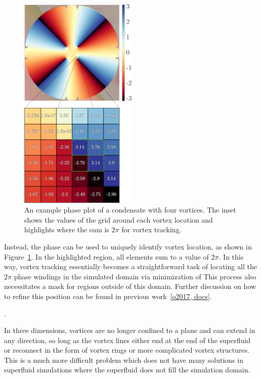 \begin{figure}
\center \includegraphics[width = 0.5\textwidth]{data/gpu/vortex_tracking/phi_grid.png}
\caption{An example phase plot of a condensate with four vortices.
The inset shows the values of the grid around each vortex location and highlights where the sum is $2\pi$ for vortex tracking.
}
\label{fig:phase}
\end{figure}

Instead, the phase can be used to uniquely identify vortex location, as shown in Figure~\ref{fig:phase}.
In the highlighted region, all elements sum to a value of $2\pi$.
In this way, vortex tracking essentially becomes a straightforward task of locating all the $2\pi$ phase windings in the simulated domain via minimization of
This process also necessitates a mask for regions outside of this domain.
Further discussion on how to refine this position can be found in previous work~\ref{o2017, docs}.

.

In three dimensions, vortices are no longer confined to a plane and can extend in any direction, so long as the vortex lines either end at the end of the superfluid or reconnect in the form of vortex rings or more complicated vortex structures.
This is a much more difficult problem which does not have many solutions in superfluid simulations where the superfluid does not fill the simulation domain.

